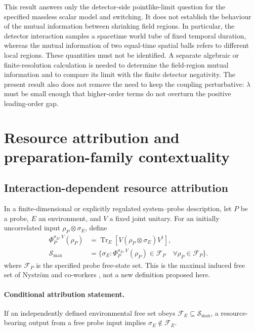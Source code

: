 \documentclass[pdflatex,sn-mathphys-num]{sn-jnl}
\newcommand{\Tr}{\operatorname{Tr}}
\begin{document}
This result answers only the detector-side pointlike-limit question for the specified massless scalar model and switching. It does not establish the behaviour of the mutual information between shrinking field regions. In particular, the detector interaction samples a spacetime world tube of fixed temporal duration, whereas the mutual information of two equal-time spatial balls refers to different local regions. These quantities must not be identified. A separate algebraic or finite-resolution calculation is needed to determine the field-region mutual information and to compare its limit with the finite detector negativity. The present result also does not remove the need to keep the coupling perturbative: $\lambda$ must be small enough that higher-order terms do not overturn the positive leading-order gap.







\section{Resource attribution and preparation-family contextuality}
\label{app:contextuality}
\subsection{Interaction-dependent resource attribution}
In a finite-dimensional or explicitly regulated system--probe description, let $P$ be a probe, $E$ an environment, and $V$ a fixed joint unitary. For an initially uncorrelated input $\rho_P\otimes\sigma_E$, define
\begin{equation}
\begin{aligned}
\Phi_P^{\sigma_E,V}(\rho_P)&=\Tr_E[V(\rho_P\otimes\sigma_E)V^\dagger],\\
\mathcal S_{\max}&=\{\sigma_E:\Phi_P^{\sigma_E,V}(\rho_P)\in\mathcal F_P
\quad\forall\rho_P\in\mathcal F_P\}.
\end{aligned}
\label{eq:induced-free-set}
\end{equation}
where $\mathcal F_P$ is the specified probe free-state set. This is the maximal induced free set of Nystr\"om and co-workers \cite{Nystrom2026Induced}, not a new definition proposed here.

\paragraph{Conditional attribution statement.}
If an independently defined environmental free set obeys $\mathcal F_E\subseteq\mathcal S_{\max}$, a resource-bearing output from a free probe input implies $\sigma_E\notin\mathcal F_E$.
\end{document}

